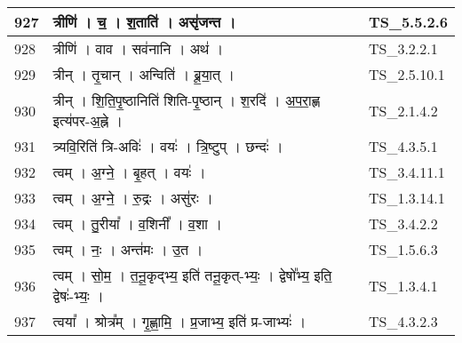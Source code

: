 \documentclass[17pt]{extarticle}
\begin{document}
\begin{longtable}{||p{0.4in}||p{4.9in}||p{0.9in}||}
    927 & त्रीणि॑   ।   च॒   ।   श॒ताति॑   ।   असृ॑जन्त   ।    & TS\_5.5.2.6       \\
    
    \hline
        
    928 & त्रीणि॑   ।   वाव   ।   सव॑नानि   ।   अथ॑   ।    & TS\_3.2.2.1       \\
    
    \hline
        
    929 & त्रीन्   ।   तृ॒चान्   ।   अन्विति॑   ।   ब्रू॒या॒त्   ।    & TS\_2.5.10.1       \\
    
    \hline
        
    930 & त्रीन्   ।   शि॒ति॒पृ॒ष्ठानिति॑ शिति{-}पृ॒ष्ठान्   ।   श॒रदि॑   ।   अ॒प॒रा॒ह्ण इत्य॑पर{-}अ॒ह्ने   ।    & TS\_2.1.4.2       \\
    
    \hline
        
    931 & त्र्यवि॒रिति॑ त्रि{-}अविः॑   ।   वयः॑   ।   त्रि॒ष्टुप्   ।   छन्दः॑   ।    & TS\_4.3.5.1       \\
    
    \hline
        
    932 & त्वम्   ।   अ॒ग्ने॒   ।   बृ॒हत्   ।   वयः॑   ।    & TS\_3.4.11.1       \\
    
    \hline
        
    933 & त्वम्   ।   अ॒ग्ने॒   ।   रु॒द्रः   ।   असु॑रः   ।    & TS\_1.3.14.1       \\
    
    \hline
        
    934 & त्वम्   ।   तु॒रीया᳚   ।   व॒शिनी᳚   ।   व॒शा   ।    & TS\_3.4.2.2       \\
    
    \hline
        
    935 & त्वम्   ।   नः॒   ।   अन्त॑मः   ।   उ॒त   ।    & TS\_1.5.6.3       \\
    
    \hline
        
    936 & त्वम्   ।   सो॒म॒   ।   त॒नू॒कृद्भ्य॒ इति॑ तनू॒कृत्{-}भ्यः॒   ।   द्वेषो᳚भ्य॒ इति॒ द्वेषः॑{-}भ्यः॒   ।    & TS\_1.3.4.1       \\
    
    \hline
        
    937 & त्वया᳚   ।   श्रोत्र᳚म्   ।   गृ॒ह्णा॒मि॒   ।   प्र॒जाभ्य॒ इति॑ प्र{-}जाभ्यः॑   ।    & TS\_4.3.2.3       \\
    

\end{longtable}
\end{document}
